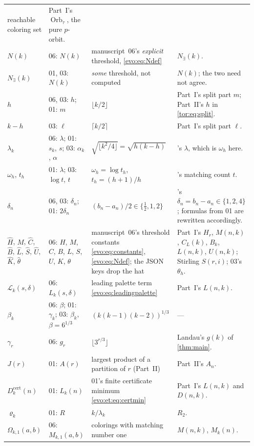 \documentclass[11pt,a4paper]{article}
\numberwithin{equation}{section}
\theoremstyle{definition}
\theoremstyle{remark}
\newcommand{\Orb}{\operatorname{Orb}}
\begin{document}
{\begin{longtable}{>{\raggedright}p{.15\linewidth}>{\raggedright}p{.22\linewidth}>{\raggedright}p{.23\linewidth}>{\raggedright\arraybackslash}p{.26\linewidth}}
 reachable coloring set & Part~I's $\Orb_\tau$, the pure $p$-orbit.\\
$N(k)$ & 06: $N(k)$ & manuscript~06's \emph{explicit} threshold,
 \eqref{evo:eq:Ndef} & $N_\exists(k)$.\\
$N_\exists(k)$ & 01, 03: $N(k)$ & \emph{some} threshold, not computed &
 $N(k)$; the two need not agree.\\
$h$ & 06, 03: $h$; 01: $m$ & $\lfloor k/2\rfloor$ & Part~I's split part $m$;
 Part~II's $h$ in \eqref{tor:eq:split}.\\
$k-h$ & 03: $\ell$ & $\lceil k/2\rceil$ & Part~I's split part $\ell$.\\
$\lambda_k$ & 06: $\lambda$; 01: $s_k$, $s$; 03: $\alpha_k$, $\alpha$ &
 $\sqrt{\lfloor k^2/4\rfloor}=\sqrt{h(k-h)}$ & 01's $\lambda$, which is
 $\omega_h$ here.\\
$\omega_h$, $t_h$ & 01: $\lambda$; 03: $\log t$, $t$ &
 $\omega_h=\log t_h$, $t_h=(h+1)/h$ & 06's matching count $t$.\\
$\delta_n$ & 06, 03: $\delta_n$; 01: $2\delta_n$ & $(b_n-a_n)/2\in
 \{\tfrac12,1,2\}$ & 01's $\delta_n=b_n-a_n\in\{1,2,4\}$; formulas from 01
 are rewritten accordingly.\\
$\hat H$, $\hat M$, $\hat C$, $\hat B$, $\hat L$, $\hat S$, $\hat U$,
 $\hat K$, $\hat\theta$ & 06: $H$, $M$, $C$, $B$, $L$, $S$, $U$, $K$,
 $\theta$ & manuscript~06's threshold constants
 \eqref{evo:eq:constants}, \eqref{evo:eq:Ndef}; the JSON keys drop the hat &
 Part~I's $H_r$, $M(n,k)$, $C_L(k)$, $B_k$, $L(n,k)$, $U(n,k)$; Stirling
 $S(r,i)$; 03's $\theta_h$.\\
$\mathcal L_k(s,\delta)$ & 06: $L_k(s,\delta)$ & leading palette term
 \eqref{evo:eq:leadingpalette} & Part~I's $L(n,k)$.\\
$\beta_k$ & 06: $\beta$; 01: $\gamma_k$; 03: $\beta_k$, $\beta=6^{1/3}$ &
 $(k(k-1)(k-2))^{1/3}$ & ---\\
$\gamma_r$ & 06: $g_r$ & $\lfloor3^{r/3}\rfloor$ & Landau's $g(k)$ of
 \cref{thm:main}.\\
$J(r)$ & 01: $A(r)$ & largest product of a partition of $r$ (Part~II) &
 Part~II's $A_n$.\\
$D^{\mathrm{cert}}_k(n)$ & 01: $L_k(n)$ & 01's finite certificate minimum
 \eqref{evo:et:eq:certmin} & Part~I's $L(n,k)$ and $D(n,k)$.\\
$\varrho_k$ & 01: $R$ & $k/\lambda_k$ & $R_2$.\\
$\Omega_{k,1}(a,b)$ & 06: $M_{k,1}(a,b)$ & colorings with matching number
 one & $M(n,k)$, $M_k(n)$.\\

\end{longtable}}
\end{document}
